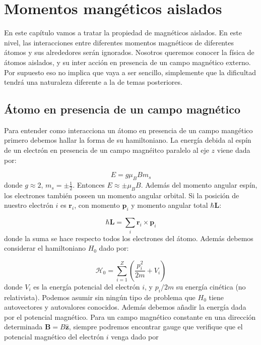 \documentclass[12pt,a4paper]{book}
\numberwithin{equation}{section}
\numberwithin{figure}{section}
\newcommand{\parentesis}[1]{\left( #1  \right)}
\newcommand{\Hcal}{\mathcal{H}}
\newcommand{\zn}{\mathbf{z}}
\newcommand{\rn}{\mathbf{r}}
\newcommand{\pn}{\mathbf{p}}
\newcommand{\Bn}{\mathbf{B}}
\newcommand{\Ln}{\mathbf{L}}
\newcommand{\hnz}{\hat{\zn}}
\begin{document}



\chapter{Momentos mangéticos aislados}

En este capítulo vamos a tratar la propiedad de magnéticos aislados. En este nivel, las interacciones entre diferentes momentos magnéticos de diferentes átomos y sus alrededores serán ignorados. Nosotros queremos conocer la física de átomos aislados, y su inter
acción en presencia de un campo magnético externo. Por supuesto eso no implica que vaya a ser sencillo, simplemente que la dificultad tendrá una naturaleza diferente a la de temas posteriores. 

\section{Átomo en presencia de un campo magnético}

Para entender como interacciona un átomo en presencia de un campo mangético primero debemos hallar la forma de su hamiltoniano. La energía debida al espín de un electrón en presencia de un campo magnéitco paralelo al eje $z$ viene dada por:

\begin{equation}
E = g \mu_B B m_s
\end{equation}
donde $g \approx 2$, $m_s = \pm \frac{1}{2}$. Entonces $E \approx \pm \mu_B B$. Además del momento angular espín, los electrones también poseen un momento angular orbital. Si la posición de nuestro electrón $i$ es $\rn_i$, con momento $\pn_i$ y momento angular total $\hbar \Ln$:

\begin{equation}
\hbar \Ln = \sum_i \rn_i \times \pn_i
\end{equation}
donde la suma se hace respecto todos los electrones del átomo. Además debemos considerar el hamiltoniano $H_0$ dado por:

\begin{equation}
\Hcal_0 = \sum_{i=1}^Z \parentesis{\frac{p_i^2}{2m} + V_i}
\end{equation}
donde $V_i$ es la energía potencial del electrón $i$, y $p_i/2m$ su energía cinética (no relativista). Podemos asumir sin ningún tipo de problema que $H_0$ tiene autovectores y autovalores conocidos. Además debemos añadir la energía dada por el potencial magnético. Para un campo magnético constante en una dirección determinada $\Bn = B \hnz$, siempre podremos encontrar gauge que verifique que el potencial magnético del electrón $i$ venga dado por 
\end{document}
